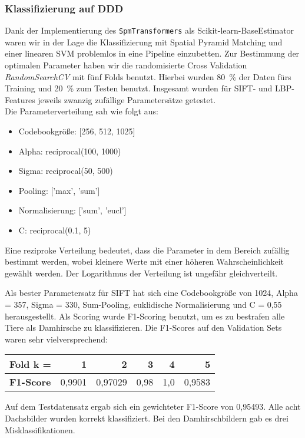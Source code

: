 \subsubsection{Klassifizierung auf DDD}

Dank der Implementierung des \texttt{SpmTransformers} als Scikit-learn-BaseEstimator waren wir in der Lage die Klassifizierung mit Spatial Pyramid Matching und einer linearen SVM problemlos in eine Pipeline einzubetten. Zur Bestimmung der optimalen Parameter haben wir die randomisierte Cross Validation \emph{RandomSearchCV} mit fünf Folds benutzt. Hierbei wurden 80~\% der Daten fürs Training und 20~\% zum Testen benutzt. Insgesamt wurden für SIFT- und LBP-Features jeweils zwanzig zufällige Parametersätze getestet.\\
Die Parameterverteilung sah wie folgt aus:
\begin{itemize}
	\item Codebookgröße: [256, 512, 1025]
	\item Alpha: reciprocal(100, 1000)
	\item Sigma: reciprocal(50, 500)
	\item Pooling: ['max', 'sum']
	\item Normalisierung: ['sum', 'eucl']
	\item C: reciprocal(0.1, 5)
\end{itemize} 

Eine reziproke Verteilung bedeutet, dass die Parameter in dem Bereich zufällig bestimmt werden, wobei kleinere Werte mit einer höheren Wahrscheinlichkeit gewählt werden. Der Logarithmus der Verteilung ist ungefähr gleichverteilt.

Als bester Parametersatz für SIFT hat sich eine Codebookgröße von 1024, Alpha = 357, Sigma = 330, Sum-Pooling, euklidische Normalisierung und C = 0,55 herausgestellt. Als Scoring wurde F1-Scoring benutzt, um es zu bestrafen alle Tiere als Damhirsche zu klassifizieren. Die F1-Scores auf den Validation Sets waren sehr vielversprechend:

\begin{center}
\begin{tabular}{|l|r|r|r|r|r|}
	\hline
	\textbf{Fold k = } & 1 & 2 & 3 & 4 & 5 \\ \hline
	\textbf{F1-Score} & 0,9901 & 0,97029 & 0,98 & 1,0 & 0,9583 \\ \hline
\end{tabular}
\end{center}

Auf dem Testdatensatz ergab sich ein gewichteter F1-Score von 0,95493. Alle acht Dachsbilder wurden korrekt klassifiziert. Bei den Damhirschbildern gab es drei Misklassifikationen. 

